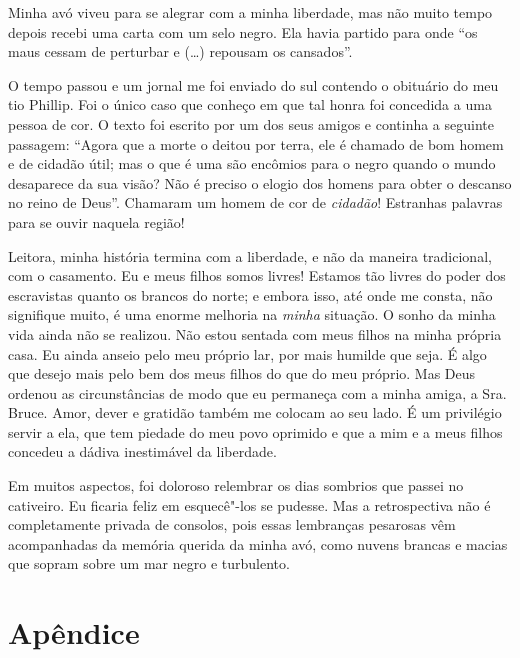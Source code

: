 Minha avó viveu para se alegrar com a
minha liberdade, mas não muito tempo depois recebi uma carta com um selo
negro. Ela havia partido para onde ``os maus cessam de perturbar e
(\ldots{}) repousam os cansados''.

O tempo passou e um jornal me foi
enviado do sul contendo o obituário do meu tio Phillip. Foi o único caso
que conheço em que tal honra foi concedida a uma pessoa de cor. O texto
foi escrito por um dos seus amigos e continha a seguinte passagem:
``Agora que a morte o deitou por terra, ele é chamado de bom homem e de
cidadão útil; mas o que é uma são encômios para o negro quando o mundo
desaparece da sua visão? Não é preciso o elogio dos homens para obter o
descanso no reino de Deus''. Chamaram um homem de cor de \emph{cidadão}!
Estranhas palavras para se ouvir naquela região!

Leitora, minha história termina com a
liberdade, e não da maneira tradicional, com o casamento. Eu e meus
filhos somos livres! Estamos tão livres do poder dos escravistas quanto
os brancos do norte; e embora isso, até onde me consta, não signifique
muito, é uma enorme melhoria na \emph{minha} situação. O sonho da minha
vida ainda não se realizou. Não estou sentada com meus filhos na minha
própria casa. Eu ainda anseio pelo meu próprio lar, por mais humilde que
seja. É algo que desejo mais pelo bem dos meus filhos do que do meu
próprio. Mas Deus ordenou as circunstâncias de modo que eu permaneça com
a minha amiga, a Sra.\,Bruce. Amor, dever e gratidão também me colocam ao
seu lado. É um privilégio servir a ela, que tem piedade do meu povo
oprimido e que a mim e a meus filhos concedeu a dádiva inestimável da
liberdade.

Em muitos aspectos, foi doloroso
relembrar os dias sombrios que passei no cativeiro. Eu ficaria feliz em
esquecê"-los se pudesse. Mas a retrospectiva não é completamente privada
de consolos, pois essas lembranças pesarosas vêm acompanhadas da memória
querida da minha avó, como nuvens brancas e macias que sopram sobre um
mar negro e turbulento.

\chapter*{Apêndice}

\begin{flushright}
\end{flushright} 

